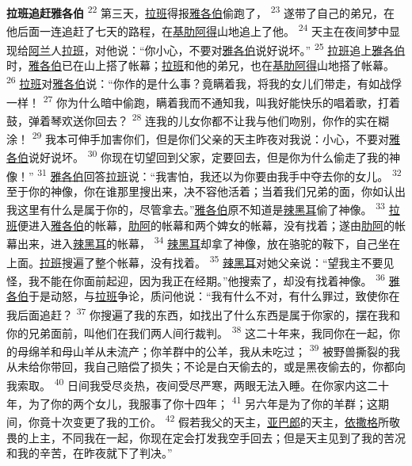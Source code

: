 \textbf{拉班追赶雅各伯 }
\textsuperscript{22}
第三天，\uline{拉班}得报\uline{雅各伯}偷跑了，
\textsuperscript{23}
遂带了自己的弟兄，在他后面一连追赶了七天的路程，在\uline{基肋}\uline{阿得}山地追上了他。
\textsuperscript{24}
天主在夜间梦中显现给\uline{阿兰}人\uline{拉班}，对他说：“你小心，不要对\uline{雅各伯}说好说坏。”
\textsuperscript{25}
\uline{拉班}追上\uline{雅各伯}时，\uline{雅各伯}已在山上搭了帐幕；\uline{拉班}和他的弟兄，也在\uline{基肋}\uline{阿得}山地搭了帐幕。
\textsuperscript{26}
\uline{拉班}对\uline{雅各伯}说：“你作的是什么事？竟瞒着我，将我的女儿们带走，有如战俘一样！
\textsuperscript{27}
你为什么暗中偷跑，瞒着我而不通知我，叫我好能快乐的唱着歌，打着鼓，弹着琴欢送你回去？
\textsuperscript{28}
连我的儿女你都不让我与他们吻别，你作的实在糊涂！
\textsuperscript{29}
我本可伸手加害你们，但是你们父亲的天主昨夜对我说：小心，不要对\uline{雅各伯}说好说坏。
\textsuperscript{30}
你现在切望回到父家，定要回去，但是你为什么偷走了我的神像！”
\textsuperscript{31}
\uline{雅各伯}回答\uline{拉班}说：“我害怕，我还以为你要由我手中夺去你的女儿。
\textsuperscript{32}
至于你的神像，你在谁那里搜出来，决不容他活着；当着我们兄弟的面，你如认出我这里有什么是属于你的，尽管拿去。”\uline{雅各伯}原不知道是\uline{辣黑耳}偷了神像。
\textsuperscript{33}
\uline{拉班}便进入\uline{雅各伯}的帐幕，\uline{肋阿}的帐幕和两个婢女的帐幕，没有找着；遂由\uline{肋阿}的帐幕出来，进入\uline{辣黑耳}的帐幕，
\textsuperscript{34}
\uline{辣黑耳}却拿了神像，放在骆驼的鞍下，自己坐在上面。\uline{拉班}搜遍了整个帐幕，没有找着。
\textsuperscript{35}
\uline{辣黑耳}对她父亲说：“望我主不要见怪，我不能在你面前起迎，因为我正在经期。”他搜索了，却没有找着神像。
\textsuperscript{36}
\uline{雅各伯}于是动怒，与\uline{拉班}争论，质问他说：“我有什么不对，有什么罪过，致使你在我后面追赶？
\textsuperscript{37}
你搜遍了我的东西，如找出了什么东西是属于你家的，摆在我和你的兄弟面前，叫他们在我们两人间行裁判。
\textsuperscript{38}
这二十年来，我同你在一起，你的母绵羊和母山羊从未流产；你羊群中的公羊，我从未吃过；
\textsuperscript{39}
被野兽撕裂的我从未给你带回，我自己赔偿了损失；不论是白天偷去的，或是黑夜偷去的，你都向我索取。
\textsuperscript{40}
日间我受尽炎热，夜间受尽严寒，两眼无法入睡。在你家内这二十年，为了你的两个女儿，我服事了你十四年；
\textsuperscript{41}
另六年是为了你的羊群；这期间，你竟十次变更了我的工价。
\textsuperscript{42}
假若我父的天主，\uline{亚巴郎}的天主，\uline{依撒格}所敬畏的上主，不同我在一起，你现在定会打发我空手回去；但是天主见到了我的苦况和我的辛苦，在昨夜就下了判决。”

